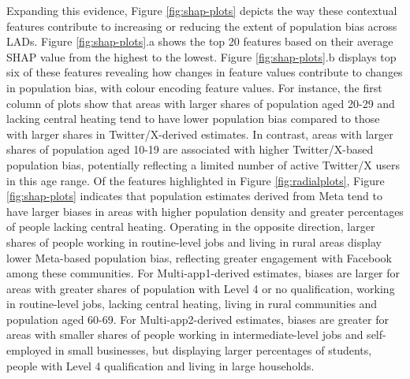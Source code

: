 \documentclass{article}
\begin{document}
Expanding this evidence, Figure \ref{fig:shap-plots} depicts the way
these contextual features contribute to increasing or reducing the
extent of population bias across LADs. Figure \ref{fig:shap-plots}.a
shows the top 20 features based on their average SHAP value from the
highest to the lowest. Figure \ref{fig:shap-plots}.b displays top six of
these features revealing how changes in feature values contribute to
changes in population bias, with colour encoding feature values. For
instance, the first column of plots show that areas with larger shares
of population aged 20-29 and lacking central heating tend to have lower
population bias compared to those with larger shares in
Twitter/X-derived estimates. In contrast, areas with larger shares of
population aged 10-19 are associated with higher Twitter/X-based
population bias, potentially reflecting a limited number of active
Twitter/X users in this age range. Of the features highlighted in Figure
\ref{fig:radialplots}, Figure \ref{fig:shap-plots} indicates that
population estimates derived from Meta tend to have larger biases in
areas with higher population density and greater percentages of people
lacking central heating. Operating in the opposite direction, larger
shares of people working in routine-level jobs and living in rural areas
display lower Meta-based population bias, reflecting greater engagement
with Facebook among these communities. For Multi-app1-derived estimates,
biases are larger for areas with greater shares of population with Level
4 or no qualification, working in routine-level jobs, lacking central
heating, living in rural communities and population aged 60-69. For
Multi-app2-derived estimates, biases are greater for areas with smaller
shares of people working in intermediate-level jobs and self-employed in
small businesses, but displaying larger percentages of students, people
with Level 4 qualification and living in large households.
\end{document}
